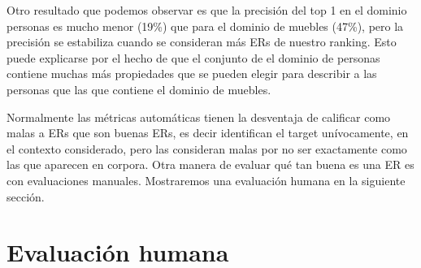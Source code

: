 \begin{table}[H]
Otro resultado que podemos observar es que la precisi\'on  del top 1 en el dominio personas es mucho menor (19\%) que para el dominio de muebles (47\%), pero la precisi\'on se estabiliza cuando se consideran m\'as ERs de nuestro ranking. Esto puede explicarse por el hecho de que el conjunto de el dominio de personas contiene muchas m\'as propiedades que se pueden elegir para describir a las personas que las que contiene el dominio de muebles.

Normalmente las m\'etricas autom\'aticas tienen la desventaja de calificar como malas a ERs que son buenas ERs, es decir identifican el target un\'ivocamente, en el contexto considerado, pero las consideran malas por no ser exactamente como las que aparecen en corpora. Otra manera de evaluar qu\'e tan buena es una ER es con evaluaciones manuales. Mostraremos una evaluaci\'on humana en la siguiente secci\'on.

 

\section{Evaluaci\'on humana} \label{sec:humanevaluation}






\end{table}
